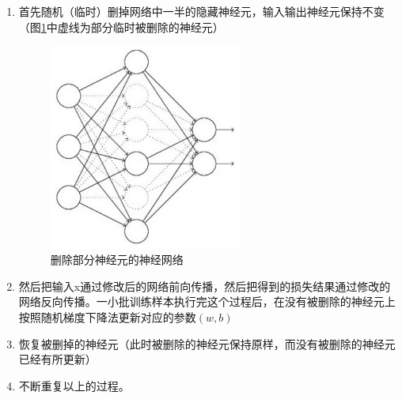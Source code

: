 \documentclass[UTF8]{ctexart}
\begin{document}
\begin{enumerate}
	\item 首先随机（临时）删掉网络中一半的隐藏神经元，输入输出神经元保持不变（图\ref{dropout2}中虚线为部分临时被删除的神经元） \begin{figure}[htb]
		\centering
		\includegraphics[width=0.6\textwidth]{figures/dropout2.jpg}
		\caption{删除部分神经元的神经网络}
		\label{dropout2}
	\end{figure}
	\item 然后把输入x通过修改后的网络前向传播，然后把得到的损失结果通过修改的网络反向传播。一小批训练样本执行完这个过程后，在没有被删除的神经元上按照随机梯度下降法更新对应的参数$(w, b)$
	\item 恢复被删掉的神经元（此时被删除的神经元保持原样，而没有被删除的神经元已经有所更新）
	\item 不断重复以上的过程。
\end{enumerate}
\end{document}
